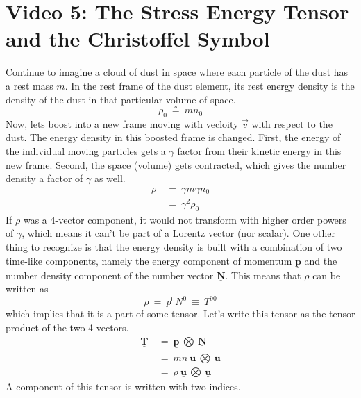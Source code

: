 \section*{Video 5: The Stress Energy Tensor and the Christoffel Symbol}
\hskip 25pt Continue to imagine a cloud of dust in space where each particle of the dust has a rest mass $m$.  In the rest
frame of the dust element, its rest energy density is the density of the dust in that particular volume of space.
\begin{equation}
  \rho_0\ \circeq\ mn_0
\end{equation}
Now, lets boost into a new frame moving with vecloity $\vec{v}$ with respect to the dust.  The energy density in this boosted
frame is changed.  First, the energy of the individual moving particles gets a $\gamma$ factor from their kinetic energy in
this new frame.  Second, the space (volume) gets contracted, which gives the number density a factor of $\gamma$ as well.
\begin{equation}
  \begin{aligned}
    \rho\ &=\ \gamma m\gamma n_0 \\
    &=\ \gamma^2\rho_0
  \end{aligned}
\end{equation}
If $\rho$ was a 4-vector component, it would not transform with higher order powers of $\gamma$, which means it can't be
part of a Lorentz vector (nor scalar).  One other thing to recognize is that the energy density is built with a combination
of two time-like components, namely the energy component of momentum $\underline{\mathbf{p}}$ and the number density
component of the number vector $\underline{\mathbf{N}}$.  This means that $\rho$ can be written as
\begin{equation}
  \rho\ =\ p^0N^0\ \equiv\ T^{00}
\end{equation}
which implies that it is a part of some tensor.  Let's write this tensor as the tensor product of the two 4-vectors.
\begin{equation}
  \begin{aligned}
    \underline{\underline{\mathbf{T}}}\ &=\ \underline{\mathbf{p}}\ \bigotimes\ \underline{\mathbf{N}} \\
    &=\ mn\ \underline{\mathbf{u}}\ \bigotimes\ \underline{\mathbf{u}} \\
    &=\ \rho\ \underline{\mathbf{u}}\ \bigotimes\ \underline{\mathbf{u}}
  \end{aligned}
\end{equation}
A component of this tensor is written with two indices.
